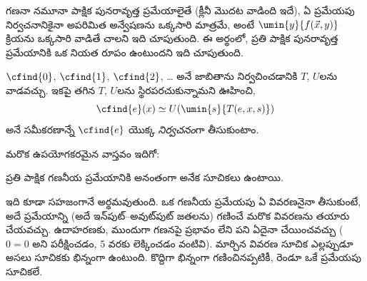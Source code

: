 \documentclass[../../../include/open-logic-section]{subfiles}
\begin{document}
గణనా నమూనా పాక్షిక పునరావృత్త ప్రమేయాలైతే (క్లీనీ మొదట వాడింది ఇదే),
ఏ ప్రమేయపు నిర్వచనానికైనా అపరిమిత అన్వేషణను ఒక్కసారి మాత్రమే, అంటే
$\umin{y}{f(\vec x,y)}$ క్రియను ఒక్కసారి వాడితే చాలని
ఇది చూపుతుంది. ఈ అర్థంలో, ప్రతి పాక్షిక పునరావృత్త ప్రమేయానికి ఒక
నియత రూపం ఉంటుందని ఇది చూపుతుంది.

$\cfind{0}$, $\cfind{1}$, $\cfind{2}$, \dots{} అనే జాబితాను
నిర్వచించడానికి $T$, $U$లను వాడవచ్చు. ఇకపై తగిన $T$, $U$లను
స్థిరపరచుకున్నామని ఊహించి,
\[
\cfind{e}(x) \simeq U(\umin{s}{T(e,x,s)})
\]
అనే సమీకరణాన్నే $\cfind{e}$ యొక్క \emph{నిర్వచనం}గా తీసుకుంటాం.

మరొక ఉపయోగకరమైన వాస్తవం ఇదిగో:

\begin{thm}
ప్రతి పాక్షిక గణనీయ ప్రమేయానికి అనంతంగా అనేక సూచికలు ఉంటాయి.
\end{thm}

ఇది కూడా సహజంగానే అర్థమవుతుంది. ఒక గణనీయ ప్రమేయపు ఏ వివరణనైనా
తీసుకుంటే, అదే ప్రమేయాన్ని (అదే ఇన్‌పుట్--అవుట్‌పుట్ జతలను) గణించే
మరొక వివరణను తయారు చేయవచ్చు. ఉదాహరణకు, ముందుగా గణనపై ప్రభావం లేని
పని ఏదైనా చేయించవచ్చు ($0=0$ అని పరీక్షించడం, $5$ వరకు లెక్కించడం
వంటివి). మార్చిన వివరణ సూచిక ఎల్లప్పుడూ అసలు సూచికకు భిన్నంగా
ఉంటుంది. కొద్దిగా భిన్నంగా గణించినప్పటికీ, రెండూ ఒకే ప్రమేయపు
సూచికలే.
\end{document}
